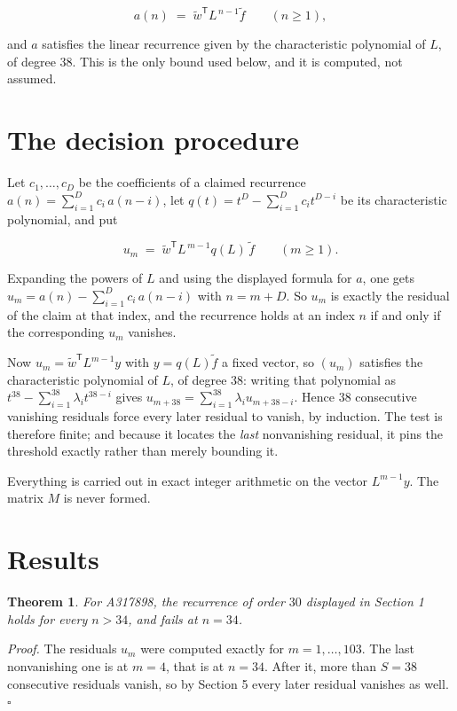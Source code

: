 \documentclass[11pt]{article}
\newtheorem{theorem}{Theorem}
\theoremstyle{definition}
\begin{document}
\[a(n) \;=\; \tilde w^{\mathsf T} L^{\,n-1} \tilde f \qquad (n \ge 1),\]

and $a$ satisfies the linear recurrence given by the characteristic polynomial of $L$, of degree $38$. This is the only bound used below, and it is computed, not assumed.

\section{The decision procedure}

Let $c_1,\dots,c_D$ be the coefficients of a claimed recurrence $a(n) = \sum_{i=1}^{D} c_i\,a(n-i)$, let $q(t) = t^{D} - \sum_{i=1}^{D} c_i t^{D-i}$ be its characteristic polynomial, and put

\[u_m \;=\; \tilde w^{\mathsf T} L^{\,m-1} q(L)\,\tilde f \qquad (m \ge 1).\]

Expanding the powers of $L$ and using the displayed formula for $a$, one gets $u_m = a(n) - \sum_{i=1}^{D} c_i\,a(n-i)$ with $n = m + D$. So $u_m$ is exactly the residual of the claim at that index, and the recurrence holds at an index $n$ if and only if the corresponding $u_m$ vanishes.

Now $u_m = \tilde w^{\mathsf T} L^{m-1} y$ with $y = q(L)\tilde f$ a fixed vector, so $(u_m)$ satisfies the characteristic polynomial of $L$, of degree $38$: writing that polynomial as $t^{38} - \sum_{i=1}^{38} \lambda_i t^{38-i}$ gives $u_{m+38} = \sum_{i=1}^{38} \lambda_i u_{m+38-i}$. Hence $38$ consecutive vanishing residuals force every later residual to vanish, by induction. The test is therefore finite; and because it locates the {\itshape last} nonvanishing residual, it pins the threshold exactly rather than merely bounding it.

Everything is carried out in exact integer arithmetic on the vector $L^{m-1}y$. The matrix $M$ is never formed.

\section{Results}

\begin{theorem} For A317898, the recurrence of order $30$ displayed in Section 1 holds for every $n > 34$, and fails at $n = 34$.\end{theorem}

{\itshape Proof.} The residuals $u_m$ were computed exactly for $m = 1,\dots,103$. The last nonvanishing one is at $m = 4$, that is at $n = 34$. After it, more than $S = 38$ consecutive residuals vanish, so by Section 5 every later residual vanishes as well. $\square$
\end{document}
